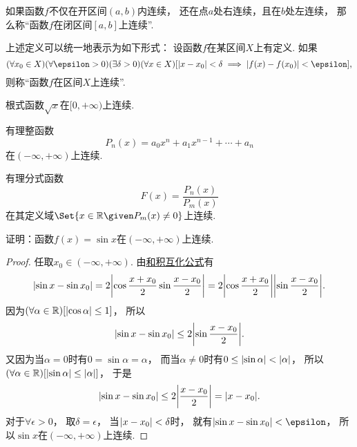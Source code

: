 \begin{definition}
如果函数\(f\)不仅在开区间\((a,b)\)内连续，
还在点\(a\)处右连续，且在\(b\)处左连续，
那么称“函数\(f\)在闭区间\([a,b]\)上连续”.
\end{definition}

\begin{remark}
上述定义可以统一地表示为如下形式：
设函数\(f\)在某区间\(X\)上有定义.
如果\[
	(\forall x_0\in X)
	(\forall\epsilon>0)
	(\exists\delta>0)
	(\forall x\in X)
	[
		\abs{x-x_0}<\delta
		\implies
		\abs{f(x)-f(x_0)}<\epsilon
	],
\]
则称“函数\(f\)在区间\(X\)上连续”.
\end{remark}

\begin{example}
根式函数\(\sqrt{x}\)在\([0,+\infty)\)上连续.
\end{example}

\begin{example}
有理整函数\[
	P_n(x) = a_0 x^n + a_1 x^{n-1} + \dotsb + a_n
\]在\((-\infty,+\infty)\)上连续.
\end{example}

\begin{example}
有理分式函数\[
	F(x) = \frac{P_n(x)}{P_m(x)}
\]在其定义域\(\Set{ x\in\mathbb{R} \given P_m(x)\neq0 }\)上连续.
\end{example}

\begin{example}\label{example:极限.正弦函数在实数域上连续}
证明：函数\(f(x) = \sin x\)在\((-\infty,+\infty)\)上连续.
\begin{proof}
任取\(x_0\in(-\infty,+\infty)\).
由\hyperref[equation:函数.三角函数.和积互化公式12]{和积互化公式}有\[
	\abs{\sin x - \sin x_0}
	= 2 \abs{\cos\frac{x+x_0}2 \sin\frac{x-x_0}2}
	= 2 \abs{\cos\frac{x+x_0}2} \abs{\sin\frac{x-x_0}2}.
\]
因为\((\forall\alpha\in\mathbb{R})[\abs{\cos\alpha}\leq1]\)，
所以\[
	\abs{\sin x - \sin x_0} \leq 2 \abs{\sin\frac{x-x_0}2}.
\]
又因为当\(\alpha=0\)时有\(0=\sin\alpha=\alpha\)，
而当\(\alpha\neq0\)时有\(0\leq\abs{\sin\alpha}<\abs{\alpha}\)，
所以\((\forall\alpha\in\mathbb{R})[\abs{\sin\alpha}\leq\abs{\alpha}]\)，
于是\[
	\abs{\sin x - \sin x_0}
	\leq 2 \abs{\frac{x-x_0}2}
	= \abs{x-x_0}.
\]
对于\(\forall\epsilon>0\)，
取\(\delta=\epsilon\)，
当\(\abs{x-x_0}<\delta\)时，
就有\(\abs{\sin x-\sin x_0}<\epsilon\)，
所以\(\sin x\)在\((-\infty,+\infty)\)上连续.
\end{proof}
\end{example}

